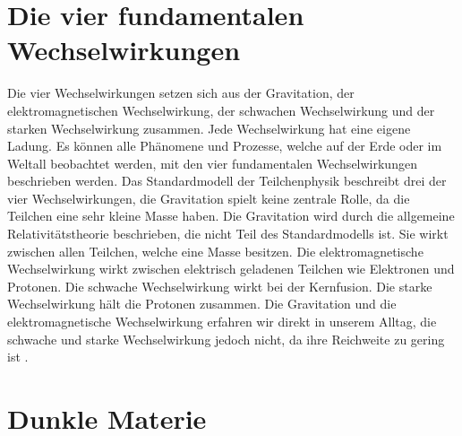 

\section{Die vier fundamentalen Wechselwirkungen}

Die vier Wechselwirkungen setzen sich aus der Gravitation, der elektromagnetischen Wechselwirkung, der schwachen Wechselwirkung und der starken Wechselwirkung zusammen. Jede Wechselwirkung hat eine eigene Ladung. Es können alle Phänomene und Prozesse, welche auf der Erde oder im Weltall beobachtet werden, mit den vier fundamentalen Wechselwirkungen beschrieben werden.
Das Standardmodell der Teilchenphysik beschreibt drei der vier Wechselwirkungen, die Gravitation spielt keine zentrale Rolle, da die Teilchen eine sehr kleine Masse haben. Die Gravitation wird durch die allgemeine Relativitätstheorie beschrieben, die nicht Teil des Standardmodells ist. Sie wirkt zwischen allen Teilchen, welche eine Masse besitzen. 
Die elektromagnetische Wechselwirkung wirkt zwischen elektrisch geladenen Teilchen wie Elektronen und Protonen. Die schwache Wechselwirkung wirkt bei der Kernfusion. Die starke Wechselwirkung hält die Protonen zusammen.
Die Gravitation und die elektromagnetische Wechselwirkung erfahren wir direkt in unserem Alltag, die schwache und starke Wechselwirkung jedoch nicht, da ihre Reichweite zu gering ist \cite{Bührke2022}.

\section{Dunkle Materie}

